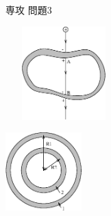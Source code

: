 \documentclass[fleqn]{jbook}
\begin{document}
\begin{answer}{専攻 問題3}{}
\begin{subanswers}
\begin{subsubanswers}
{   \begin{center}
    \includegraphics[clip,height=36mm,width=45mm]{1998phy3-1.eps}
   \end{center}
   \begin{center}
     \includegraphics[clip,height=30mm]{1998phy3-2.eps}
   \end{center}
   }
  \end{subsubanswers}
 

\end{subanswers}
\end{answer}
\end{document}
